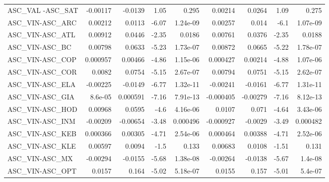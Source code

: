 \begin{tabular}{lrrrrrrrr}
ASC\_VAL -ASC\_SAT                       &    -0.00117 &      -0.0139 &    1.05 &    0.295 &    0.00214 &      0.0264 &         1.09 &         0.275 \\
ASC\_VIN-ASC\_ARC                        &     0.00212 &       0.0113 &   -6.07 & 1.24e-09 &    0.00257 &       0.014 &         -6.1 &      1.07e-09 \\
ASC\_VIN-ASC\_ATL                        &     0.00912 &       0.0446 &   -2.35 &   0.0186 &    0.00761 &      0.0376 &        -2.35 &        0.0188 \\
ASC\_VIN-ASC\_BC                         &     0.00798 &       0.0633 &   -5.23 & 1.73e-07 &    0.00872 &      0.0665 &        -5.22 &      1.78e-07 \\
ASC\_VIN-ASC\_COP                        &    0.000957 &      0.00466 &   -4.86 & 1.15e-06 &   0.000427 &     0.00214 &        -4.88 &      1.07e-06 \\
ASC\_VIN-ASC\_COR                        &      0.0082 &       0.0754 &   -5.15 & 2.67e-07 &    0.00794 &      0.0751 &        -5.15 &      2.62e-07 \\
ASC\_VIN-ASC\_ELA                        &    -0.00225 &      -0.0149 &   -6.77 & 1.32e-11 &   -0.00241 &     -0.0161 &        -6.77 &      1.31e-11 \\
ASC\_VIN-ASC\_GIA                        &     8.6e-05 &     0.000591 &   -7.16 & 7.91e-13 &  -0.000405 &    -0.00279 &        -7.16 &      8.12e-13 \\
ASC\_VIN-ASC\_HOD                        &     0.00968 &       0.0595 &    -4.6 & 4.16e-06 &     0.0107 &       0.071 &        -4.64 &      3.43e-06 \\
ASC\_VIN-ASC\_INM                        &    -0.00209 &     -0.00654 &   -3.48 & 0.000496 &  -0.000927 &     -0.0029 &        -3.49 &      0.000482 \\
ASC\_VIN-ASC\_KEB                        &    0.000366 &      0.00305 &   -4.71 & 2.54e-06 &   0.000464 &     0.00388 &        -4.71 &      2.52e-06 \\
ASC\_VIN-ASC\_KLE                        &     0.00597 &       0.0094 &    -1.5 &    0.133 &    0.00683 &      0.0108 &        -1.51 &         0.131 \\
ASC\_VIN-ASC\_MX                         &    -0.00294 &      -0.0155 &   -5.68 & 1.38e-08 &   -0.00264 &     -0.0138 &        -5.67 &       1.4e-08 \\
ASC\_VIN-ASC\_OPT                        &      0.0157 &        0.164 &   -5.02 & 5.18e-07 &     0.0155 &       0.157 &        -5.01 &       5.4e-07 \\

\end{tabular}
